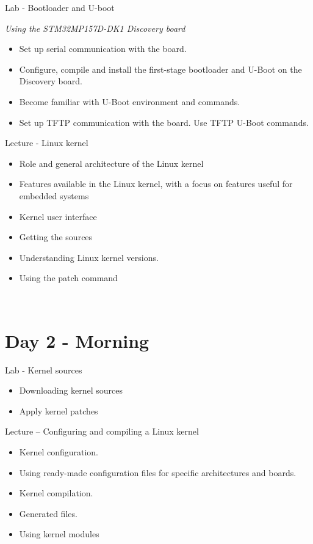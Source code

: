 \documentclass[a4paper,12pt,obeyspaces,spaces,hyphens]{article}
\begin{document}
\feagendatwocolumn
{Lab - Bootloader and U-boot}
{
  {\em Using the STM32MP157D-DK1 Discovery board}
  \begin{itemize}
  \item Set up serial communication with the board.
  \item Configure, compile and install the first-stage bootloader
        and U-Boot on the Discovery board.
  \item Become familiar with U-Boot environment and commands.
  \item Set up TFTP communication with the board. Use TFTP U-Boot commands.
  \end{itemize}
}
{Lecture - Linux kernel}
{
  \begin{itemize}
  \item Role and general architecture of the Linux kernel
  \item Features available in the Linux kernel,
        with a focus on features useful for embedded systems
  \item Kernel user interface
  \item Getting the sources
  \item Understanding Linux kernel versions.
  \item Using the patch command
  \end{itemize}
}
\\

\section{Day 2 - Morning}

\feagendatwocolumn
{Lab - Kernel sources}
{
  \begin{itemize}
  \item Downloading kernel sources
  \item Apply kernel patches
  \end{itemize}
}
{Lecture – Configuring and compiling a Linux kernel}
{
  \begin{itemize}
  \item Kernel configuration.
  \item Using ready-made configuration files for specific architectures and boards.
  \item Kernel compilation.
  \item Generated files.
  \item Using kernel modules
  \end{itemize}
}
\end{document}
